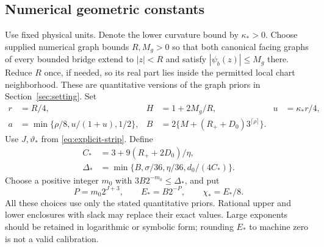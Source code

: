 \subsection{Numerical geometric constants}
Use fixed physical units. Denote the lower curvature bound by
$\kappa_*>0$. Choose supplied numerical graph bounds $R,M_g>0$ so that
both canonical facing graphs of every bounded bridge extend to $|z|<R$
and satisfy $|\psi_b(z)|\le M_g$ there. Reduce $R$ once, if needed,
so its real part lies inside the permitted local chart neighborhood.
These are quantitative versions of the graph priors in
Section~\ref{sec:setting}. Set
\begin{align}
 r&=R/4,&H&=1+2M_g/R,&u&=\kappa_*r/4,\label{eq:eff-local}\\
 a&=\min\{\rho/8,u/(1+u),1/2\},&
 B&=2\{M+(R_++D_0)3^{\lceil\rho\rceil}\}.\label{eq:eff-strip}
\end{align}
Use $J,\vartheta_*$ from \eqref{eq:explicit-strip}. Define
\begin{align}
 C_*&=3+9(R_++2D_0)/\eta,\label{eq:eff-rigid}\\
 \Delta_*&=\min\{B,\sigma/36,\eta/36,d_0/(4C_*)\}.
                                                        \label{eq:eff-delta}
\end{align}
Choose a positive integer $m_0$ with
$3B2^{-m_0}\le\Delta_*$, and put
\begin{equation}\label{eq:eff-threshold}
 P=m_0 2^{J+3},\qquad E_*=B2^{-P},\qquad \chi_*=E_*/8.
\end{equation}
All these choices use only the stated quantitative priors. Rational
upper and lower enclosures with slack may replace their exact values.
Large exponents should be retained in logarithmic or symbolic form;
rounding $E_*$ to machine zero is not a valid calibration.


